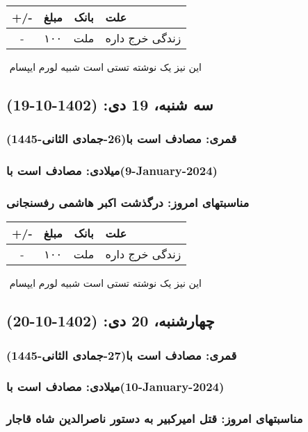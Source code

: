 \documentclass{article}
\newcommand{\rnote}[1]{\marginpar{\textcolor{color}{\StrSubstitute{\##1}{ }{\_}}}}
\newcommand{\myRow}[4]{
    #1 & #2 & #3 & #4 \\ \hline
}
\begin{document}
\begin{tabular}{ | c | c | c | p{5cm} |}
    \hline
    \myRow{ +/- }{مبلغ}{بانک}{علت}
    \myRow{-}{۱۰۰}{ملت}{زندگی خرج داره}
\end{tabular}
\newline
\newline

‌
\rnote{تست}
این نیز یک نوشته تستی است شبیه لورم ایپسام




\newpage
{}
\textcolor{color}{
\section{ سه شنبه، 19 دی: (1402-10-19) }
\subsubsection*{قمری: مصادف است با(26-جمادی الثانی-1445)} 
\subsubsection*{میلادی: مصادف است با(9-January-2024)}
\subsubsection*{مناسبتهای امروز: درگذشت اکبر هاشمی رفسنجانی}
}


\begin{tabular}{ | c | c | c | p{5cm} |}
    \hline
    \myRow{ +/- }{مبلغ}{بانک}{علت}
    \myRow{-}{۱۰۰}{ملت}{زندگی خرج داره}
\end{tabular}
\newline
\newline

‌
\rnote{تست}
این نیز یک نوشته تستی است شبیه لورم ایپسام




\newpage
{}
\textcolor{color}{
\section{ چهارشنبه، 20 دی: (1402-10-20) }
\subsubsection*{قمری: مصادف است با(27-جمادی الثانی-1445)} 
\subsubsection*{میلادی: مصادف است با(10-January-2024)}
\subsubsection*{مناسبتهای امروز: قتل امیرکبیر به دستور ناصرالدین شاه قاجار}
}
\end{document}
